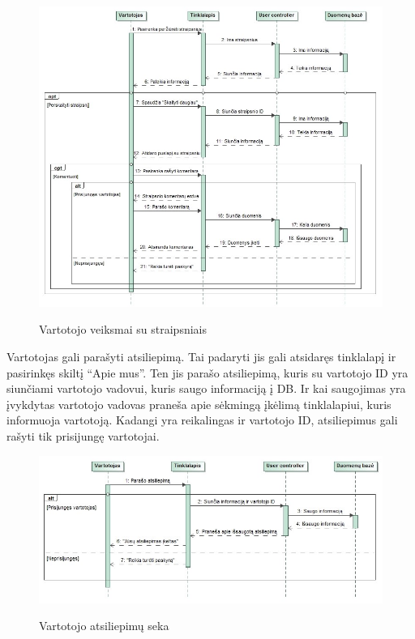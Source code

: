 ﻿\documentclass{VUMIFPSkursinis}
\begin{document}
\begin{figure}[H]
    \centering
    \includegraphics[scale=0.45]{img/Pav/VartotojasStraips_Komentarai}
    \label{img:uml5}
	\caption{Vartotojo veiksmai su straipsniais}
\end{figure}	
	
Vartotojas gali parašyti atsiliepimą. Tai padaryti jis gali atsidaręs tinklalapį ir pasirinkęs skiltį “Apie mus”. Ten jis parašo atsiliepimą, kuris su vartotojo ID yra siunčiami vartotojo vadovui, kuris saugo informaciją į DB. Ir kai saugojimas yra įvykdytas vartotojo vadovas praneša apie sėkmingą įkėlimą tinklalapiui, kuris informuoja vartotoją. Kadangi yra reikalingas ir vartotojo ID, atsiliepimus gali rašyti tik prisijungę vartotojai.
	
\begin{figure}[H]
    \centering
    \includegraphics[scale=0.45]{img/Pav/VartotojasAtsiliepimas}
    \label{img:uml6}
	\caption{Vartotojo atsiliepimų seka}
\end{figure}	
	
\end{document}
